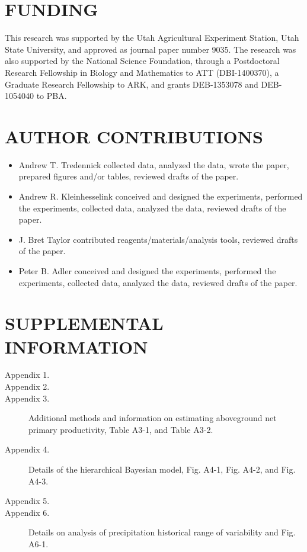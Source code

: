 \documentclass[fleqn,10pt,lineno]{wlpeerj} %
\begin{document}
\hypertarget{funding}{%
\section{FUNDING}\label{funding}}

This research was supported by the Utah Agricultural Experiment Station,
Utah State University, and approved as journal paper number 9035. The
research was also supported by the National Science Foundation, through
a Postdoctoral Research Fellowship in Biology and Mathematics to ATT
(DBI-1400370), a Graduate Research Fellowship to ARK, and grants
DEB-1353078 and DEB-1054040 to PBA.

\hypertarget{author-contributions}{%
\section{AUTHOR CONTRIBUTIONS}\label{author-contributions}}

\begin{itemize}
  \item Andrew T. Tredennick collected data, analyzed the data, wrote the paper, prepared figures and/or tables, reviewed drafts of the paper.
  \item Andrew R. Kleinhesselink conceived and designed the experiments, performed the experiments, collected data, analyzed the data, reviewed drafts of the paper.
  \item J. Bret Taylor contributed reagents/materials/analysis tools, reviewed drafts of the paper.
  \item Peter B. Adler conceived and designed the experiments, performed the experiments, collected data, analyzed the data, reviewed drafts of the paper.
\end{itemize}

\hypertarget{supplemental-information}{%
\section{SUPPLEMENTAL INFORMATION}\label{supplemental-information}}

\begin{description}
\item [Appendix 1.] 
\item [Appendix 2.] 
\item [Appendix 3.] Additional methods and information on estimating aboveground net primary productivity, Table A3-1, and Table A3-2.
\item [Appendix 4.] Details of the hierarchical Bayesian model, Fig. A4-1, Fig. A4-2, and Fig. A4-3.
\item [Appendix 5.] 
\item [Appendix 6.] Details on analysis of precipitation historical range of variability and Fig. A6-1.
\end{description}
\end{document}
